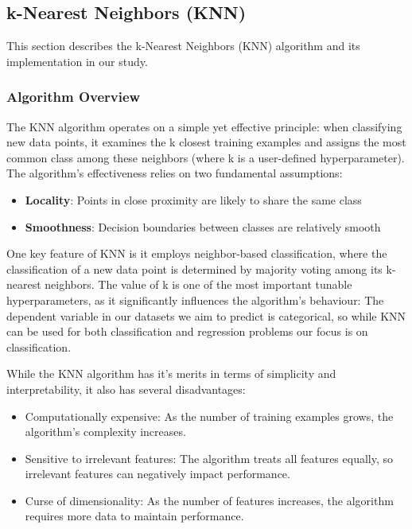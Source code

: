 \subsection{k-Nearest Neighbors (KNN)}
\label{subsec:methods-knn}

This section describes the k-Nearest Neighbors (KNN) algorithm and its implementation in our study.

\subsubsection{Algorithm Overview}

The KNN algorithm operates on a simple yet effective principle: when classifying new data points, 
it examines the k closest training examples and assigns the most common class among these neighbors (where k is a user-defined hyperparameter). 
The algorithm's effectiveness relies on two fundamental assumptions:
\begin{itemize}
    \item \textbf{Locality}: Points in close proximity are likely to share the same class
    \item \textbf{Smoothness}: Decision boundaries between classes are relatively smooth
\end{itemize}

One key feature of KNN is it employs neighbor-based classification, where the classification of a new data point 
is determined by majority voting among its k-nearest neighbors. 
The value of k is one of the most important tunable hyperparameters, as it significantly influences the algorithm's behaviour:
The dependent variable in our datasets we aim to predict is categorical, so while KNN can be used for both classification and regression problems 
our focus is on classification.

While the KNN algorithm has it's merits in terms of simplicity and interpretability, it also has several disadvantages:
\begin{itemize}
    \item Computationally expensive: As the number of training examples grows, the algorithm's complexity increases\cite{laviale2023}.
\item Sensitive to irrelevant features: The algorithm treats all features equally, so irrelevant features can negatively impact performance.
    \item Curse of dimensionality: As the number of features increases, the algorithm requires more data to maintain performance.
\end{itemize}

